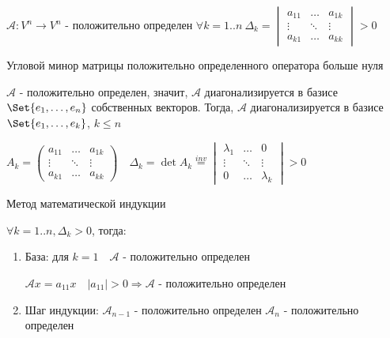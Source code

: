 \documentclass[12pt]{article}
\begin{document}
    \hypertarget{criterionSilvester}{}

    \begin{MyTheorem}

    $\mathcal{A}: V^n \to V^n$ - положительно определен \Longleftrightarrow $\forall k = 1..n \ \Delta_k =
    \begin{vmatrix}a_{11} & \dots & a_{1k} \\ \vdots & \ddots & \vdots \\ a_{k1} & \dots & a_{kk}\end{vmatrix} > 0$ 

    Угловой минор матрицы положительно определенного оператора больше нуля

    \end{MyTheorem}

    \begin{MyProof}

        \fbox{$\Longrightarrow$} $\mathcal{A}$ - положительно определен, значит, $\mathcal{A}$ диагонализируется в базисе $\Set{e_1, \dots, e_n}$ собственных векторов.
        Тогда, $\mathcal{A}$ диагонализируется в базисе $\Set{e_1, \dots, e_k}$, $k \leq n$

        $A_k = \begin{pmatrix}a_{11} & \dots & a_{1k} \\ \vdots & \ddots & \vdots \\ a_{k1} & \dots & a_{kk}\end{pmatrix} \quad
        \Delta_k = \det A_k \stackrel{inv}{=} \begin{vmatrix}\lambda_{1} & \dots & 0 \\ \vdots & \ddots & \vdots \\ 0 & \dots & \lambda_{k}\end{vmatrix} > 0$

        \fbox{$\Longleftarrow$} Метод математической индукции

        $\forall k = 1..n, \Delta_k > 0$, тогда:

        \begin{enumerate}
            \item База: для $k = 1 \quad \mathcal{A}$ - положительно определен

            $\mathcal{A}x = a_{11}x \quad |a_{11}| > 0 \Longrightarrow \mathcal{A}$ - положительно определен

            \item Шаг индукции: $\mathcal{A}_{n-1}$ - положительно определен \Longrightarrow $\mathcal{A}_n$ - положительно определен


\end{enumerate}
\end{MyProof}
\end{document}
